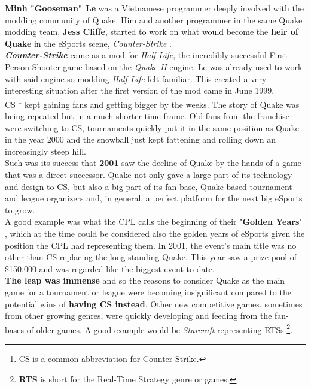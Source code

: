 \textbf{Minh "Gooseman" Le} \citep{gooseman} was a Vietnamese programmer deeply involved with the modding community of Quake. Him and another programmer in the same Quake modding team, \textbf{Jess Cliffe}, started to work on what would become the \textbf{heir of Quake} in the eSports scene, \textit{Counter-Strike} \citep{game:cs}.\\

\textit{\textbf{Counter-Strike}} came as a mod for \textit{Half-Life}, the incredibly successful First-Person Shooter game based on the \textit{Quake II} engine. Le was already used to work with said engine so modding \textit{Half-Life} felt familiar. This created a very interesting situation after the first version of the mod came in June 1999.\\

CS \footnote{CS is a common abbreviation for Counter-Strike.} kept gaining fans and getting bigger by the weeks. The story of Quake was being repeated but in a much shorter time frame. Old fans from the franchise were switching to CS, tournaments quickly put it in the same position as Quake in the year 2000 and the snowball just kept fattening and rolling down an increasingly steep hill.\\

Such was its success that \textbf{2001} saw the decline of Quake by the hands of a game that was a direct successor. Quake not only gave a large part of its technology and design to CS, but also a big part of its fan-base, Quake-based tournament and league organizers and, in general, a perfect platform for the next big eSports to grow.\\

A good example was what the CPL calls the beginning of their "\textbf{Golden Years}" \citep{web:cpl}, which at the time could be considered also the golden years of eSports given the position the CPL had representing them. In 2001, the event's main title was no other than CS replacing the long-standing Quake. This year saw a prize-pool of \$150.000 and was regarded like the biggest event to date.\\

\textbf{The leap was immense} and so the reasons to consider Quake as the main game for a tournament or league were becoming insignificant compared to the potential wins of \textbf{having CS instead}. Other new competitive games, sometimes from other growing genres, were quickly developing and feeding from the fan-bases of older games. A good example would be \textit{Starcraft} \citep{game:starcraft} representing RTSs \footnote{\textbf{RTS} is short for the Real-Time Strategy genre or games.}.\\

